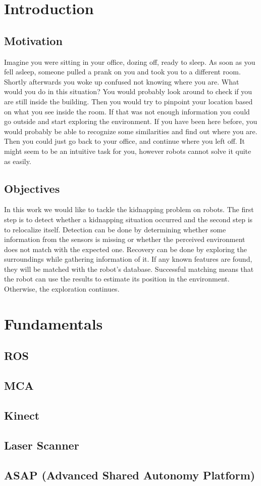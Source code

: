\chapter{Introduction}
\section{Motivation}

Imagine you were sitting in your office, dozing off, ready to sleep. As soon as you fell asleep, someone pulled a prank on you and took you to a different room. Shortly afterwards you woke up confused not knowing where you are. What would you do in this situation? You would probably look around to check if you are still inside the building. Then you would try to pinpoint your location based on what you see inside the room. If that was not enough information you could go outside and start exploring the environment. If you have been here before, you would probably be able to recognize some similarities and find out where you are. Then you could just go back to your office, and continue where you left off. It might seem to be an intuitive task for you, however robots cannot solve it quite as easily.

\section{Objectives}

In this work we would like to tackle the kidnapping problem on robots. The first step is to detect whether a kidnapping situation occurred and the second step is to relocalize itself. Detection can be done by determining whether some information from the sensors is missing or whether the perceived environment does not match with the expected one. Recovery can be done by exploring the surroundings while gathering  information of it. If any known features are found, they will be matched with the robot's database. Successful matching means that the robot can use the results to estimate its position in the environment. Otherwise, the exploration continues.

\chapter{Fundamentals}
\section{ROS}
\section{MCA}
\section{Kinect}
\section{Laser Scanner}
\section{ASAP (Advanced Shared Autonomy Platform)}

